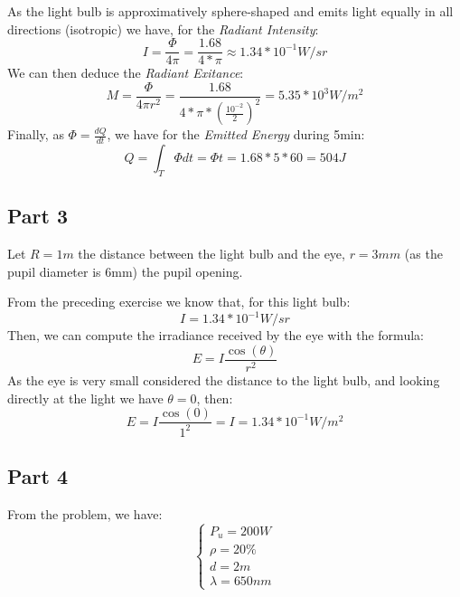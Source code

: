 \documentclass[a4,12pt]{article}
\begin{document}
	As the light bulb is approximatively sphere-shaped and emits light equally in all directions (isotropic) we have, for the \textit{Radiant Intensity}:
	$$
	I = \frac{\Phi}{4\pi} = \frac{1.68}{4*\pi} \approx \boxed{1.34*10^{-1} W/sr}
	$$
	We can then deduce the \textit{Radiant Exitance}:
	$$
	M = \frac{\Phi}{4\pi r^2} = \frac{1.68}{4*\pi*(\frac{10^{-2}}{2})^2} = \boxed{5.35*10^3 W/m^2}
	$$
	Finally, as $\Phi = \frac{dQ}{dt}$, we have for the \textit{Emitted Energy} during 5min:
	$$
	Q = \int_T \Phi dt = \Phi t = 1.68*5*60 = \boxed{504J}
	$$
	 
	\subsection{Part 3}
	Let $R = 1m$ the distance between the light bulb and the eye, $r = 3mm$ (as the pupil diameter is 6mm) the pupil opening.
	
	From the preceding exercise we know that, for this light bulb:
	$$
	I = 1.34*10^{-1} W/sr
	$$
	Then, we can compute the irradiance received by the eye with the formula:
	$$
	E = I\frac{\cos(\theta)}{r^2}
	$$
	As the eye is very small considered the distance to the light bulb, and looking directly at the light we have $\theta = 0$, then:
	$$
	E = I\frac{\cos(0)}{1^2} = \boxed{I = 1.34*10^{-1} W/m^2}
	$$
	
%	
	
%	
	
	
	
	\subsection{Part 4}
	From the problem, we have:
	$$
	\begin{cases}
	P_u = 200W\\
	\rho = 20\%\\
	d = 2m\\
	\lambda = 650nm
	\end{cases}
	$$	
	
\end{document}
